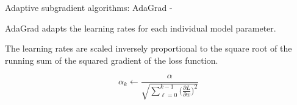 


\begin{frame}[t,allowframebreaks]{
    Adaptive subgradient algorithms: AdaGrad -}

    \gls{AdaGrad} \cite{Duchi:11a} adapts the 
    \glspl{learning rate} 
    for each individual model parameter.\\
    \vspace{0.2cm}

    The \glspl{learning rate} are scaled inversely proportional to 
    the square root of the running sum of 
    the squared \gls{gradient} 
    of the \gls{loss function}.

    \begin{equation}
          \displaystyle
          \alpha_k \leftarrow 
          \frac{\alpha}
          {\sqrt{\sum_{\ell=0}^{k-1} 
            \Big(\frac{\partial L}{\partial w}\Big)^2}}
        \label{eq:adagrad_rate_update_rule}
    \end{equation}

\end{frame}
